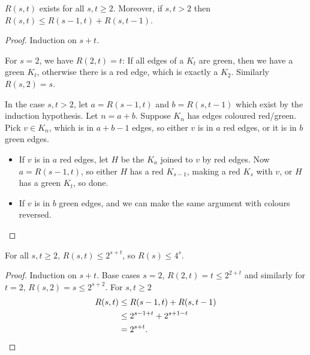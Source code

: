\documentclass{article}
\newcommand{\red}[1]{\textcolor{bred}{#1}}
\newcommand{\green}[1]{\textcolor{bgreen}{#1}}
\begin{document}
\begin{nthm}\label{thm:ramsey}
    $R(s, t)$ exists for all $s, t \geq 2$.
    Moreover, if $s, t > 2$ then $R(s, t) \leq R(s-1, t) + R(s, t-1)$.
\end{nthm}
\begin{proof}
    Induction on $s+t$.

    For $s=2$, we have $R(2, t) = t$: If all edges of a $K_t$ are \green{green}, then we have a \green{green $K_t$}, otherwise there is a \red{red edge}, which is exactly a \red{$K_2$}.  Similarly $R(s, 2) = s$.

    In the case $s, t > 2$, let $a = R(s-1, t)$ and $b = R(s, t-1)$ which exist by the induction hypothesis.  Let $n = a+b$. Suppose $K_n$ has edges coloured \red{red}/\green{green}.
    Pick $v \in K_n$, which is in $a+b-1$ edges, so either $v$ is in \red{$a$ red edges}, or it is in \green{$b$ green edges}.
    \begin{itemize}
        \item If $v$ is in \red{$a$ red edges}, let $H$ be the $K_a$ joined to $v$ by \red{red} edges.  Now $a = R(s-1, t)$, so either $H$ has a \red{red $K_{s-1}$}, making a \red{red $K_s$} with $v$, or $H$ has a \green{green $K_t$}, so done.
        \item If $v$ is in \green{$b$ green edges}, and we can make the same argument with colours reversed. \qedhere
    \end{itemize}
\end{proof}
\begin{ncor}\label{cor:3}
    For all $s, t \geq 2$, $R(s, t) \leq 2^{s+t}$, so $R(s) \leq 4^s$.
\end{ncor}
\begin{proof}
    Induction on $s + t$.  Base cases $s=2$, $R(2, t) = t \leq 2^{2+t}$ and similarly for $t=2$, $R(s, 2) = s \leq 2^{s+2}$.
    For $s, t \geq 2$
    \begin{align*}
        R(s, t) &\leq R(s-1, t) + R(s, t-1) \\
                &\leq 2^{s-1+t} + 2^{s+1-t} \\
                &= 2^{s+t}. \qedhere
    \end{align*}
\end{proof}
\end{document}
